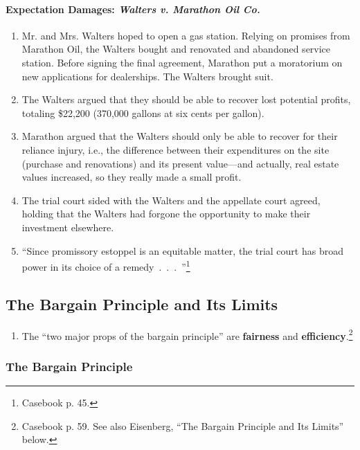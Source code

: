 \paragraph{Expectation Damages: \emph{Walters v. Marathon Oil Co.}}


\begin{enumerate}
    \item Mr. and Mrs. Walters hoped to open a gas station. Relying on 
    promises from Marathon Oil, the Walters bought and renovated and abandoned 
    service station. Before signing the final agreement, Marathon put a 
    moratorium on new applications for dealerships. The Walters brought suit.
    \item The Walters argued that they should be able to recover lost 
    potential profits, totaling \$22,200 (370,000 gallons at six cents per 
    gallon).
    \item Marathon argued that the Walters should only be able to recover for 
    their reliance injury, i.e., the difference between their expenditures on 
    the site (purchase and renovations) and its present value---and actually, 
    real estate values increased, so they really made a small profit.
    \item The trial court sided with the Walters and the appellate court 
    agreed, holding that the Walters had forgone the opportunity to make their 
    investment elsewhere.
    \item ``Since promissory estoppel is an equitable matter, the trial court 
    has broad power in its choice of a remedy~.~.~.~''\footnote{Casebook p. 
    45.}
\end{enumerate}

\subsection{The Bargain Principle and Its Limits}

\begin{enumerate}
    \item The ``two major props of the bargain principle'' are 
    \textbf{fairness} and \textbf{efficiency}.\footnote{Casebook p. 59. See 
    also Eisenberg, ``The Bargain Principle and Its Limits'' below.}
\end{enumerate}

\subsubsection{The Bargain Principle}

